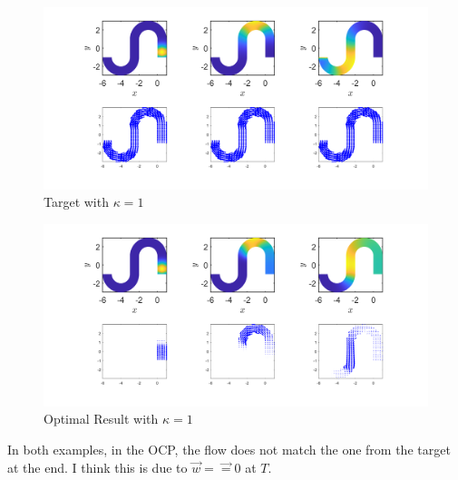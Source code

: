 \documentclass[11pt, a4paper]{article}
\theoremstyle{definition}
\begin{document}
	\begin{figure}[h]
		\centering
		\includegraphics[scale=0.35]{FW11k1.png}
		\caption{Target with $\kappa = 1$} 
		\label{F3}
	\end{figure}

	\begin{figure}[h]
		\centering
		\includegraphics[scale=0.35]{Opt11k1.png}
		\caption{Optimal Result with $\kappa = 1$} 
		\label{F4}
	\end{figure}

In both examples, in the OCP, the flow does not match the one from the target at the end. I think this is due to $\vec w = \vec = 0$ at $T$.
\end{document}
